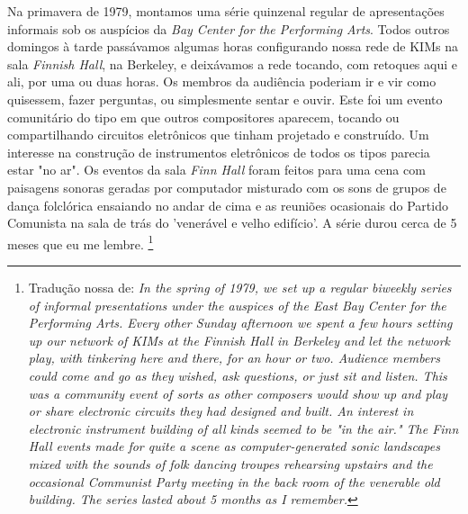 

\begin{citacao}
Na primavera de 1979, montamos uma série quinzenal regular de apresentações informais sob os auspícios da \emph{Bay Center for the Performing Arts}. Todos outros domingos à tarde passávamos algumas horas configurando nossa rede de KIMs na sala \emph{Finnish Hall}, na Berkeley, e deixávamos a rede tocando, com retoques aqui e ali, por uma ou duas horas. Os membros da audiência poderiam ir e vir como quisessem, fazer perguntas, ou simplesmente sentar e ouvir. Este foi um evento comunitário do tipo em que outros compositores aparecem, tocando ou compartilhando circuitos eletrônicos que tinham projetado e construído. Um interesse na construção de instrumentos eletrônicos de todos os tipos parecia estar "no ar". Os eventos da sala \emph{Finn Hall} foram feitos para uma cena com paisagens sonoras geradas por computador misturado com os sons de grupos de dança folclórica ensaiando no andar de cima e as reuniões ocasionais do Partido Comunista na sala de trás do 'venerável e velho edifício'. A série durou cerca de 5 meses que eu me lembre. \cite[online]{brown_indigenous_2013}\footnote{Tradução nossa de: \emph{In the spring of 1979, we set up a regular biweekly series of informal presentations under the auspices of the East Bay Center for the Performing Arts. Every other Sunday afternoon we spent a few hours setting up our network of KIMs at the Finnish Hall in Berkeley and let the network play, with tinkering here and there, for an hour or two. Audience members could come and go as they wished, ask questions, or just sit and listen. This was a community event of sorts as other composers would show up and play or share electronic circuits they had designed and built. An interest in electronic instrument building of all kinds seemed to be "in the air." The Finn Hall events made for quite a scene as computer-generated sonic landscapes mixed with the sounds of folk dancing troupes rehearsing upstairs and the occasional Communist Party meeting in the back room of the venerable old building. The series lasted about 5 months as I remember.}}
\end{citacao}

